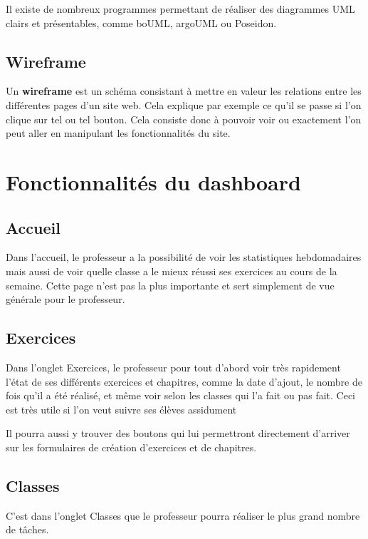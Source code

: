 \documentclass[letterpaper,10pt,french]{sphinxmanual}
\begin{document}
Il existe de nombreux programmes permettant de réaliser des diagrammes UML
clairs et présentables, comme boUML, argoUML ou Poseidon.


\section{Wireframe}
\label{introduction:wireframe}
Un \textbf{wireframe} est un schéma consistant à mettre en valeur les relations entre les
différentes pages d'un site web. Cela explique par exemple ce qu'il se passe si
l'on clique sur tel ou tel bouton. Cela consiste donc à pouvoir voir ou
exactement l'on peut aller en manipulant les fonctionnalités du site.


\chapter{Fonctionnalités du dashboard}
\label{dashboard:fonctionnalites-du-dashboard}\label{dashboard::doc}

\section{Accueil}
\label{dashboard:accueil}
Dans l'accueil, le professeur a la possibilité de voir les statistiques
hebdomadaires mais aussi de voir quelle classe a le mieux réussi ses exercices
au cours de la semaine. Cette page n'est pas la plus importante et sert simplement
de vue générale pour le professeur.


\section{Exercices}
\label{dashboard:exercices}
Dans l'onglet Exercices, le professeur pour tout d'abord voir très rapidement
l'état de ses différents exercices et chapitres, comme la date d'ajout,
le nombre de fois qu'il a été réalisé, et même voir selon les classes qui l'a
fait ou pas fait. Ceci est très utile si l'on veut suivre ses élèves assidument

Il pourra aussi y trouver des boutons qui lui permettront directement d'arriver
sur les formulaires de création d'exercices et de chapitres.


\section{Classes}
\label{dashboard:classes}
C'est dans l'onglet Classes que le professeur pourra réaliser le plus grand
nombre de tâches.
\end{document}
